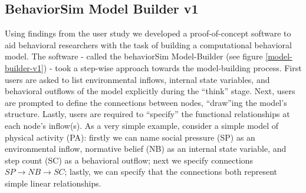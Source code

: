\documentclass{sigchi}
\begin{document}
\subsection{BehaviorSim Model Builder v1}
Using findings from the user study we developed a proof-of-concept software to aid behavioral researchers with the task of building a computational behavioral model. 
The software - called the behaviorSim Model-Builder (see figure \ref{model-builder-v1}) - took a step-wise approach towards the model-building process.
First users are asked to list environmental inflows, internal state variables, and behavioral outflows of the model explicitly during the ``think'' stage.
Next, users are prompted to define the connections between nodes, ``draw''ing the model's structure.
Lastly, users are required to ``specify'' the functional relationships at each node's inflow(s).
As a very simple example, consider a simple model of physical activity (PA): firstly we can name social pressure (SP) as an environmental inflow, normative belief (NB) as an internal state variable, and step count (SC) as a behavioral outflow; next we specify connections $SP \rightarrow NB \rightarrow SC$; lastly, we can specify that the connections both represent simple linear relationships.

\end{document}
